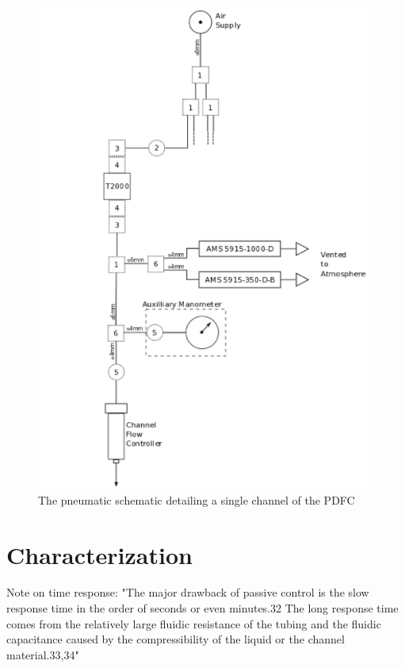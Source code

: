 \begin{figure}[h]
\centering 
\includegraphics[width=01.0\columnwidth]{pneumaticSchematic.PNG} 
\caption[Pneumatic Schematic of PDFC channel]{The pneumatic schematic detailing a single channel of the PDFC} 
\label{fig:pneumaticSchematic} 
\end{figure}

\section{Characterization}

Note on time response:
"The major drawback of passive control is the slow response
time in the order of seconds or even minutes.32 The long
response time comes from the relatively large fluidic resistance
of the tubing and the fluidic capacitance caused by the
compressibility of the liquid or the channel material.33,34"\cite{Chong2016}

